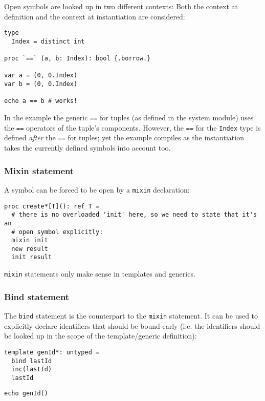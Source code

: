 Open symbols are looked up in two different contexts: Both the context
at definition and the context at instantiation are considered:

\begin{verbatim}
type
  Index = distinct int

proc `==` (a, b: Index): bool {.borrow.}

var a = (0, 0.Index)
var b = (0, 0.Index)

echo a == b # works!
\end{verbatim}

In the example the generic \texttt{==} for tuples (as defined in the
system module) uses the \texttt{==} operators of the tuple's components.
However, the \texttt{==} for the \texttt{Index} type is defined
\emph{after} the \texttt{==} for tuples; yet the example compiles as the
instantiation takes the currently defined symbols into account too.

\hypertarget{mixin-statement}{%
\subsubsection{Mixin statement}\label{mixin-statement}}

A symbol can be forced to be open by a \texttt{mixin} declaration:

\begin{verbatim}
proc create*[T](): ref T =
  # there is no overloaded 'init' here, so we need to state that it's an
  # open symbol explicitly:
  mixin init
  new result
  init result
\end{verbatim}

\texttt{mixin} statements only make sense in templates and generics.

\hypertarget{bind-statement}{%
\subsubsection{Bind statement}\label{bind-statement}}

The \texttt{bind} statement is the counterpart to the \texttt{mixin}
statement. It can be used to explicitly declare identifiers that should
be bound early (i.e. the identifiers should be looked up in the scope of
the template/generic definition):

\begin{verbatim}
template genId*: untyped =
  bind lastId
  inc(lastId)
  lastId
\end{verbatim}

\begin{verbatim}
echo genId()
\end{verbatim}

